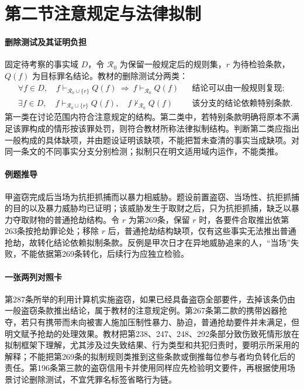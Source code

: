 \section{第二节\quad 注意规定与法律拟制}
\paragraph{删除测试及其证明负担}
固定待考察的事实域 \(D\)，令 \(\mathcal R_0\) 为保留一般规定后的规则集，\(r\) 为待检验条款，\(Q(f)\) 为目标罪名结论。教材的删除测试分两类：
\[
\begin{aligned}
&\forall f\in D,\quad
  f\vdash_{\mathcal R_0\cup\{r\}}Q(f)
       \ \Longrightarrow\ f\vdash_{\mathcal R_0}Q(f)
       &&\text{结论可以由一般规则复现};\\
&\exists f\in D,\quad
  f\vdash_{\mathcal R_0\cup\{r\}}Q(f),\quad
  f\nvdash_{\mathcal R_0}Q(f)
       &&\text{该分支的结论依赖特别条款}.
\end{aligned}
\]
第一类在讨论范围内符合注意规定的结构。第二类中，若特别条款明确将原本不满足该罪构成的情形按该罪处罚，则符合教材所称法律拟制结构。判断第二类应指出一般构成的具体缺项，并由题设证明该缺项，不能把暂未查清的事实当成缺项。对同一条文的不同事实分支分别检测；拟制只在明文适用域内运作，不能类推。

\paragraph{例题推导}
甲盗窃完成后当场为抗拒抓捕而以暴力相威胁。题设前置盗窃、当场性、抗拒抓捕的目的以及暴力威胁均已证明；该威胁发生于取财之后，只为抗拒抓捕，缺乏以暴力夺取财物的普通抢劫结构。令 \(r\) 为第269条，保留 \(r\) 时，各要件合取推出依第263条按抢劫罪论处；移除 \(r\) 后，普通抢劫结构缺项，仅有这些事实无法推出普通抢劫，故转化结论依赖拟制条款。反例是甲次日才在异地威胁追来的人，“当场”失败，不能依据第269条转化，后续行为应独立检验。

\paragraph{一张两列对照卡}
第287条所举的利用计算机实施盗窃，如果已经具备盗窃全部要件，去掉该条仍由一般盗窃条款推出结论，属于教材的注意规定例。第267条第二款的携带凶器抢夺，若只有携带而未向被害人施加压制性暴力、胁迫，普通抢劫要件并未满足，但明文赋予抢劫的处理效果。教材把第238、247、248、292条部分致伤致死情形放在拟制框架下理解，尤其涉及过失致结果、行为类型和共犯归责时，要明示所采用的解释；不能把第269条的拟制规则类推到这些条款或倒推每位参与者均负转化后的责任。第196条第三款的盗窃信用卡并使用同样应先检验明文要件，再根据使用场景讨论删除测试，不宜凭罪名标签省略行为链。


